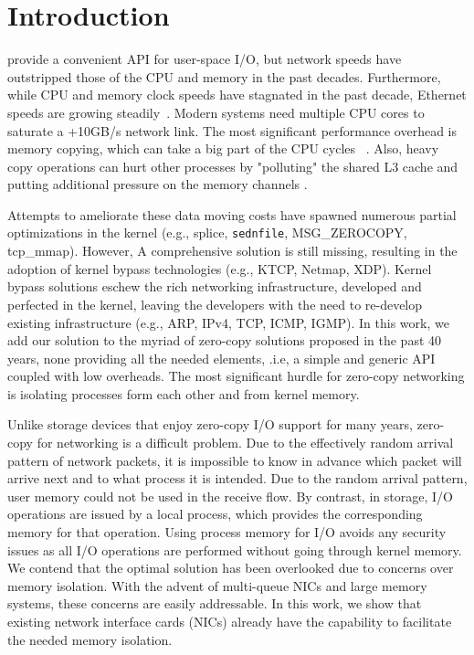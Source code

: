 \section{Introduction}

\sockets provide a convenient API for user-space I/O,  but network speeds have outstripped those of the CPU and memory in the past decades. Furthermore, while CPU and memory clock speeds have stagnated in the past decade, Ethernet speeds are growing steadily~\cite{roadmap}. Modern systems need multiple CPU cores to saturate a +10GB/s network link. The most significant performance overhead is memory copying, which can take a big part of the CPU cycles ~\cite{desendmsg}. Also, heavy copy operations can hurt other processes by "polluting" the shared L3 cache and putting additional pressure on the memory channels \cite{markuze2016true}. 

Attempts to ameliorate these data moving costs have spawned numerous partial optimizations in the kernel (e.g., splice, \texttt{sednfile}, MSG\_ZEROCOPY, tcp\_mmap). However, A comprehensive solution is still missing, resulting in the adoption of kernel bypass technologies (e.g., KTCP, Netmap, XDP). Kernel bypass solutions eschew the rich networking infrastructure, developed and perfected in the kernel, leaving the developers with the need to re-develop existing infrastructure (e.g., ARP, IPv4, TCP, ICMP, IGMP). In this work, we add our solution to the myriad of zero-copy solutions proposed in the past 40 years, none providing all the needed elements, .i.e, a simple and generic API coupled with low overheads. The most significant hurdle for zero-copy networking is isolating processes form each other and from kernel memory. 

Unlike storage devices that enjoy zero-copy I/O support for many years, zero-copy for networking is a difficult problem. Due to the effectively random arrival pattern of network packets, it is impossible to know in advance which packet will arrive next and to what process it is intended. Due to the random arrival pattern, user memory could not be used in the receive flow. By contrast, in storage, I/O operations are issued by a local process, which provides the corresponding memory for that operation. Using process memory for I/O avoids any security issues as all I/O operations are performed without going through kernel memory.
We contend that the optimal solution has been overlooked due to concerns over memory isolation. With the advent of multi-queue NICs and large memory systems, these concerns are easily addressable. In this work, we show that existing network interface cards (NICs) already have the capability to facilitate the needed memory isolation.


